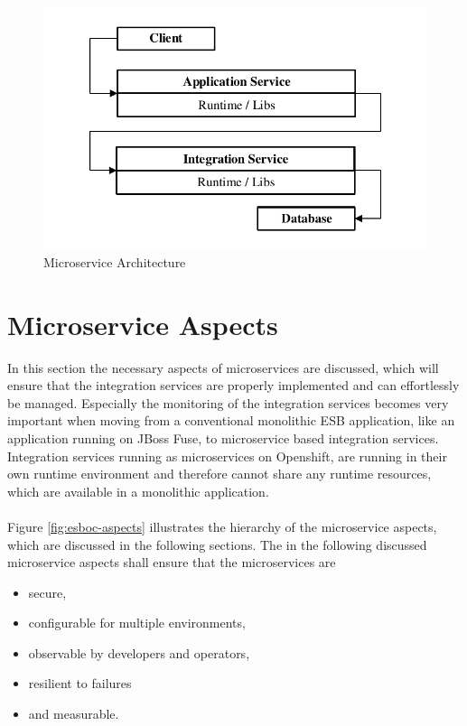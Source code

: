 \begin{figure}[htbp]
	\centering
	\includegraphics[scale=1]{images/esboc-design-microservice.pdf}
	\caption{Microservice Architecture}
	\label{fig:esboc-design-services}
\end{figure}

\section{Microservice Aspects}
\label{sec:esboc-aspects}
In this section the necessary aspects of microservices are discussed, which will ensure that the integration services are properly implemented and can effortlessly be managed. Especially the monitoring of the integration services becomes very important when moving from a conventional monolithic ESB application, like an application running on JBoss Fuse, to microservice based integration services. Integration services running as microservices on Openshift, are running in their own runtime environment and therefore cannot share any runtime resources, which are available in a monolithic application. 
\\ \\
Figure \vref{fig:esboc-aspects} illustrates the hierarchy of the microservice aspects, which are discussed in the following sections. The in the following discussed microservice aspects shall ensure that the microservices are 
\begin{itemize}
	\item secure,
	\item configurable for multiple environments,
	\item observable by developers and operators,
	\item resilient to failures
	\item and measurable.
\end{itemize}

